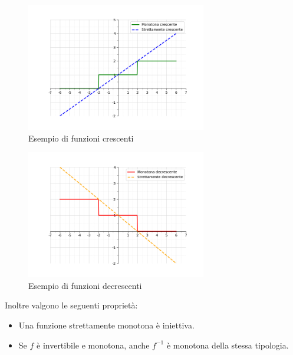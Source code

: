 \documentclass[oneside,10pt]{book} %
\begin{document}
\begin{figure}[h]
    \centering
    \includegraphics[width=0.7\textwidth]{./img/monotone_crescenti.png}
    \caption{Esempio di funzioni crescenti}
    \label{fig:funzione_crescente}
\end{figure}


\begin{figure}[h]
    \centering
    \includegraphics[width=0.7\textwidth]{./img/monotone_decrescenti.png}
    \caption{Esempio di funzioni decrescenti}
    \label{fig:funzione_decrescente}
\end{figure}

Inoltre valgono le seguenti proprietà:
\begin{itemize}
  \item Una funzione strettamente monotona è iniettiva.
  \item Se $f$ è invertibile e monotona, anche $f^{-1}$ è monotona della stessa tipologia.
\end{itemize}
\end{document}
